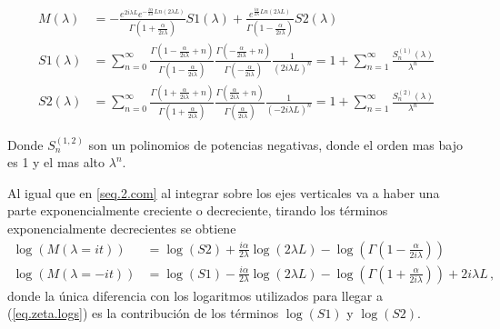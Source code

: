 \begin{align}\label{larga}
M( \lambda ) &= 
-
 \frac{e ^{2 i \lambda L } e ^{ - \frac{i \alpha  }{2 \lambda } Ln \left( 2 \lambda L \right) }  }
      { \Gamma \left( 1 + \frac{ \alpha}{2 i \lambda}  \right) } S1 ( \lambda ) +
 \frac{ e ^{   \frac{i \alpha  } {2 \lambda } Ln \left(2 \lambda L \right) } }
      { \Gamma \left( 1 - \frac{ \alpha}{2 i \lambda}  \right)   } S2 ( \lambda )        
      \\[10pt]      
S1 ( \lambda ) &= \sum _{n=0} ^{ \infty }
\frac{\Gamma (1 - \frac{ \alpha}{2 i \lambda} + n )}{\Gamma (1 - \frac{ \alpha}{2 i \lambda})} 
\frac{\Gamma (- \frac{ \alpha}{2 i \lambda} + n )}{\Gamma (- \frac{\alpha}{2 i \lambda})} 
\frac{1}{( 2 i \lambda L ) ^n} = 
1 + \sum _{n=1} ^{\infty} \frac{S ^{(1)} _n (\lambda)}{\lambda ^n} 
	\nonumber
	\\[10pt]
S2 (\lambda ) &= \sum _{n=0 } ^{\infty}
\frac{ \Gamma ( 1 + \frac{ \alpha}{2 i \lambda } + n ) }{\Gamma ( 1 + \frac{ \alpha}{2 i \lambda } )}
\frac{\Gamma ( \frac{ \alpha }{2 i \lambda} + n )}{\Gamma ( \frac{ \alpha }{2 i \lambda} )}
\frac{1}{( - 2 i \lambda L ) ^n} = 
1 + \sum _{n=1} ^{\infty} \frac{S ^{(2)} _n (\lambda)}{\lambda ^n}
\nonumber
\end{align}

Donde $S _n ^{(1,2)}$ son un polinomios de potencias negativas, donde el orden mas bajo es 1 y el mas alto $\lambda ^n$. 


Al igual que en \ref{seq.2.com} al integrar sobre los ejes verticales va a haber una parte exponencialmente creciente o decreciente, tirando los términos exponencialmente decrecientes se obtiene
\begin{align}
\log ( M ( \lambda = i t ) ) &=   \log (S2) + 
\frac{i \alpha }{2 \lambda}  \log (2 \lambda L) - 
 \log \left( \Gamma \left( 1 - \frac{ \alpha}{2 i \lambda} \right) \right) \\ 
\log ( M ( \lambda=-i t ) ) &=  \log (S1) -  
\frac{i \alpha }{2 \lambda}  \log ( 2 \lambda L ) - 
 \log \left( \Gamma \left( 1 + \frac{ \alpha}{2 i \lambda} \right) \right) +
2 i \lambda L  \nonumber
	\,	,
\end{align}
donde la única diferencia con los logaritmos utilizados para llegar a (\ref{eq.zeta.logs}) es la contribución de los términos $\log ( S1 )$ y $ \log ( S2) $.

